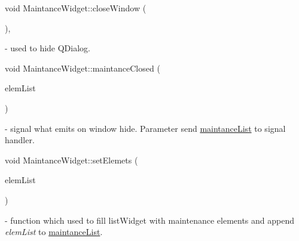 \mbox{\label{classMaintanceWidget_a239e4ddf537bfc43124ba4688fe285d0}} 
{\footnotesize\ttfamily void Maintance\+Widget\+::\texorpdfstring{close\+Window}{closeWindow} (\begin{DoxyParamCaption}{ }\end{DoxyParamCaption})\hspace{0.3cm}{\ttfamily [private]}, {\ttfamily [slot]}} - used to hide Q\+Dialog.

\mbox{\label{classMaintanceWidget_a016a9e2ad10ba518b29ac0bf336d8b97}} 
{\footnotesize\ttfamily void Maintance\+Widget\+::\texorpdfstring{maintance\+Closed}{maintanceClosed} (\begin{DoxyParamCaption}\item[{Q\+List$<$ \mbox{\hyperlink{classMaintanceElement}{Maintance\+Element}} $>$}]{elem\+List }\end{DoxyParamCaption})\hspace{0.3cm}{\ttfamily [signal]}} - signal what emits on window hide. Parameter send \hyperlink{classMaintanceWidget_a9c9003f07e28f258c99b996c3c02da45}{maintance\+List} to signal handler.

\mbox{\label{classMaintanceWidget_a32f98e1e9388b400f9b04e2fa94e8ef8}} 
{\footnotesize\ttfamily void Maintance\+Widget\+::\texorpdfstring{set\+Elemets}{setElemets} (\begin{DoxyParamCaption}\item[{Q\+List$<$ \mbox{\hyperlink{classMaintanceElement}{Maintance\+Element}} $>$}]{elem\+List }\end{DoxyParamCaption})} - function which used to fill list\+Widget with maintenance elements and append \textit{elem\+List} to \hyperlink{classMaintanceWidget_a9c9003f07e28f258c99b996c3c02da45}{maintance\+List}. 

